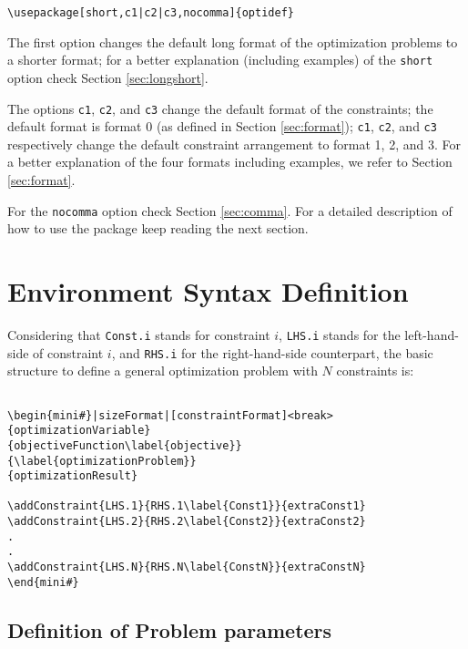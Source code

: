 \documentclass[a4paper]{article}
\begin{document}
\begin{lstlisting}
\usepackage[short,c1|c2|c3,nocomma]{optidef}
\end{lstlisting}

The first option changes the default long format of the optimization problems to a shorter format; for a better explanation (including examples) of the \verb|short| option check Section \ref{sec:longshort}. 

The options \verb|c1|, \verb|c2|, and \verb|c3| change the default format of the constraints; the default format is format 0 (as defined in Section \ref{sec:format}); \verb|c1|, \verb|c2|, and \verb|c3| respectively change the default constraint arrangement to format 1, 2, and 3. For a better explanation of the four formats including examples, we refer to Section \ref{sec:format}.

For the \verb|nocomma| option check Section \ref{sec:comma}. For a detailed description of how to use the package keep reading the next section.

\section{Environment Syntax Definition}
\label{sec:syntax}
Considering that \verb|Const.i| stands for constraint $i$, \verb|LHS.i| stands for the left-hand-side of constraint $i$, and \verb|RHS.i| for the right-hand-side counterpart, the basic structure to define a general optimization problem with $N$ constraints is:
\begin{verbatim}

\begin{mini#}|sizeFormat|[constraintFormat]<break>
{optimizationVariable}
{objectiveFunction\label{objective}}
{\label{optimizationProblem}}  
{optimizationResult}

\addConstraint{LHS.1}{RHS.1\label{Const1}}{extraConst1}
\addConstraint{LHS.2}{RHS.2\label{Const2}}{extraConst2}
.
.
\addConstraint{LHS.N}{RHS.N\label{ConstN}}{extraConstN}
\end{mini#}
\end{verbatim}

\subsection{Definition of Problem parameters}
\end{document}
